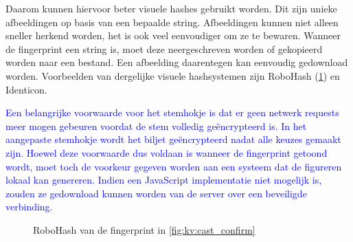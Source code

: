 \npar Daarom kunnen hiervoor beter visuele hashes gebruikt worden. Dit zijn unieke afbeeldingen op basis van een bepaalde string. Afbeeldingen kunnen niet alleen sneller herkend worden, het is ook veel eenvoudiger om ze te bewaren. Wanneer de fingerprint een string is, moet deze neergeschreven worden of gekopieerd worden naar een bestand. Een afbeelding daarentegen kan eenvoudig gedownload worden. Voorbeelden van dergelijke visuele hashsystemen zijn RoboHash (\ref{fig:sf:robohash}) en Identicon.\cite{site:robohash}\cite{wiki:identicon}


\npar \textcolor{blue}{Een belangrijke voorwaarde voor het stemhokje is dat er geen netwerk requests meer mogen gebeuren voordat de stem volledig ge\"encrypteerd is.\cite{adida_helios} In het aangepaste stemhokje wordt het biljet ge\"encrypteerd nadat alle keuzes gemaakt zijn. Hoewel deze voorwaarde dus voldaan is wanneer de fingerprint getoond wordt, moet toch de voorkeur gegeven worden aan een systeem dat de figureren lokaal kan genereren. Indien een JavaScript implementatie niet mogelijk is, zouden ze gedownload kunnen worden van de server over een beveiligde verbinding.}

\begin{figure}
  \caption{RoboHash van de fingerprint in \ref{fig:kv:cast_confirm}}
  \label{fig:sf:robohash}
\end{figure}
